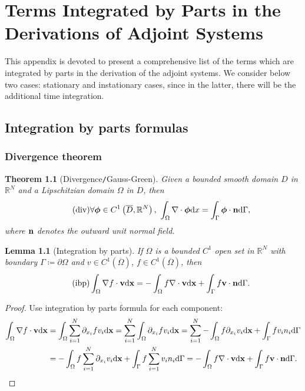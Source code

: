 \documentclass[oneside,11pt]{book}
\numberwithin{equation}{section}
\newtheorem{lemma}{Lemma}[section]
\newtheorem{theorem}{Theorem}[section]
\begin{document}
\chapter{Terms Integrated by Parts in the Derivations of Adjoint Systems}

This appendix is devoted to present a comprehensive list of the terms which are integrated by parts in the derivation of the adjoint systems. We consider below two cases: stationary and instationary cases, since in the latter, there will be the additional time integration.

\section{Integration by parts formulas}

\subsection{Divergence theorem}

\begin{theorem}[Divergence\texttt{/}Gauss-Green]
    \label{theorem: divergence}
    Given a bounded smooth domain $D$ in $\mathbb{R}^N$ and a Lipschitzian domain $\Omega$ in $D$, then
    \begin{align}
        \label{div}
        \tag{div}
        \forall\boldsymbol{\phi}\in C^1\left(\overline{D},\mathbb{R}^N\right),\ \int_\Omega \nabla\cdot\boldsymbol{\phi}{\rm d}x = \int_\Gamma \boldsymbol{\phi}\cdot{\bf n}{\rm d}\Gamma,
    \end{align}
    where ${\bf n}$ denotes the outward unit normal field.
\end{theorem}

\begin{lemma}[Integration by parts]
    If $\Omega$ is a bounded $C^1$ open set in $\mathbb{R}^N$ with boundary $\Gamma\coloneqq\partial\Omega$ and $v\in C^1(\overline{\Omega})$, $f\in C^1(\overline{\Omega})$, then
    \begin{align}
        \label{ibp}
        \tag{ibp}
        \int_\Omega \nabla f\cdot{\bf v}{\rm d}{\bf x} = -\int_\Omega f\nabla\cdot{\bf v}{\rm d}{\bf x} + \int_\Gamma f{\bf v}\cdot{\bf n}{\rm d}\Gamma.
    \end{align}
\end{lemma}

\begin{proof}
    Use integration by parts formula for each component:
    \begin{align*}
        \int_\Omega \nabla f\cdot{\bf v}{\rm d}{\bf x} &= \int_\Omega \sum_{i=1}^N \partial_{x_i}fv_i{\rm d}{\bf x} = \sum_{i=1}^N \int_\Omega \partial_{x_i}fv_i{\rm d}{\bf x} = \sum_{i=1}^N -\int_\Omega f\partial_{x_i}v_i{\rm d}{\bf x} + \int_\Gamma fv_in_i{\rm d}\Gamma\\
        &= -\int_\Omega f\sum_{i=1}^N \partial_{x_i}v_i{\rm d}{\bf x} + \int_\Gamma f\sum_{i=1}^N v_in_i{\rm d}\Gamma = -\int_\Omega f\nabla\cdot{\bf v}{\rm d}{\bf x} + \int_\Gamma f{\bf v}\cdot{\bf n}{\rm d}\Gamma.
    \end{align*}
\end{proof}
\end{document}
